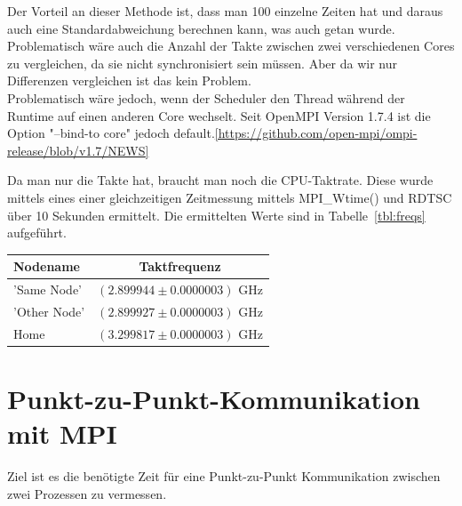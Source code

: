 \documentclass[12pt,a4paper]{article}
\begin{document}
Der Vorteil an dieser Methode ist, dass man 100 einzelne Zeiten hat und daraus auch eine Standardabweichung berechnen kann, was auch getan wurde. Problematisch wäre auch die Anzahl der Takte zwischen zwei verschiedenen Cores zu vergleichen, da sie nicht synchronisiert sein müssen. Aber da wir nur Differenzen vergleichen ist das kein Problem.\\
Problematisch wäre jedoch, wenn der Scheduler den Thread während der Runtime auf einen anderen Core wechselt.  Seit OpenMPI Version 1.7.4 ist die Option "--bind-to core" jedoch default.\ref{https://github.com/open-mpi/ompi-release/blob/v1.7/NEWS}

Da man nur die Takte hat, braucht man noch die CPU-Taktrate. Diese wurde mittels eines einer gleichzeitigen Zeitmessung mittels MPI\_Wtime() und RDTSC über 10 Sekunden ermittelt. Die ermittelten Werte sind in Tabelle~\ref{tbl:freqs} aufgeführt.\\

\begin{center}
\captionsetup{type=table}
\begin{tabular}{|l|c|}
	\hline
	Nodename & Taktfrequenz \\
	\hline
	\hline
	'Same Node'  & $(2.899944 \pm 0.0000003)$ GHz \\
	'Other Node' & $(2.899927 \pm 0.0000003)$ GHz \\
	Home         & $(3.299817 \pm 0.0000003)$ GHz \\
	\hline
\end{tabular}
\label{tbl:freqs}
\end{center}

\newpage


\section{Punkt-zu-Punkt-Kommunikation mit MPI}


Ziel ist es die benötigte Zeit für eine Punkt-zu-Punkt Kommunikation zwischen zwei Prozessen zu vermessen.
\end{document}
